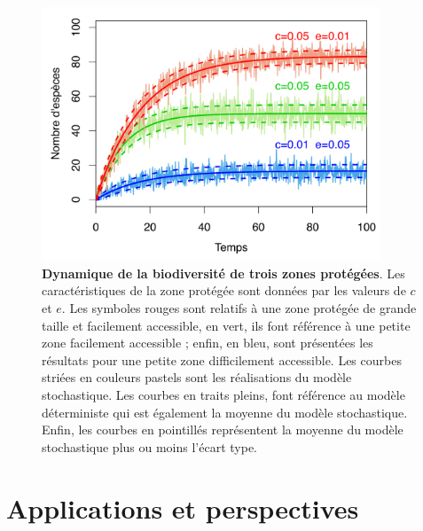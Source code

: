 \begin{figure}[h!]
\centering
\includegraphics[width=0.9\textwidth]{annexe1/fig/figAnnI2.pdf}
\caption[Dynamique de la biodiversité de trois zones protégées]{\textbf{Dynamique de la biodiversité de trois zones protégées}. Les caractéristiques de la zone protégée sont données par les valeurs de $c$ et $e$. Les symboles rouges sont relatifs à une zone protégée de grande taille et facilement accessible, en vert, ils font référence à une petite zone facilement accessible ; enfin, en bleu, sont présentées les résultats pour une petite zone difficilement accessible. Les courbes striées en couleurs pastels sont les réalisations du modèle stochastique. Les courbes en traits pleins, font référence au modèle déterministe qui est également la moyenne du modèle stochastique. Enfin, les courbes en pointillés représentent la moyenne du modèle stochastique plus ou moins l'écart type.}
\label{figAnnI2}
\end{figure}



\section{Applications et perspectives}

